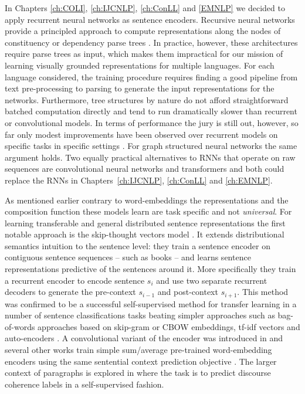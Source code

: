In Chapters \ref{ch:COLI}, \ref{ch:IJCNLP}, \ref{ch:ConLL} and \ref{EMNLP} we decided to apply
recurrent neural networks as sentence encoders.
Recursive neural networks provide a principled approach to
compute representations along the nodes of constituency
or dependency parse trees \citep{socher2013recursive,socher2014grounded,le2015compositional,tai2015improved}.
In practice, however, these architectures require parse trees as input,
which makes them impractical for our mission of learning visually grounded
representations for multiple languages.
For each language considered, the training procedure requires finding a good
pipeline from text pre-processing to parsing to generate the input representations
for the networks. Furthermore, tree structures by nature do not
afford straightforward batched computation directly and tend to run dramatically
slower than recurrent or convolutional models. In terms of performance the jury
is still out, however, so far only modest improvements have been observed
over recurrent models on specific tasks in specific settings
\citep{li2015tree,tai2015improved}. For graph structured neural networks the
same argument holds. Two equally practical alternatives to RNNs
that operate on raw sequences are convolutional neural networks
\citep{bai2018empirical} and transformers \citep{vaswani2017attention} and both could
replace the RNNs in Chapters~\ref{ch:IJCNLP}, \ref{ch:ConLL} and \ref{ch:EMNLP}.



As mentioned earlier contrary to word-embeddings the representations
and the composition function these models learn are task specific and not \emph{universal}.
For learning transferable and general distributed sentence representations the
first notable approach is the
skip-thought vectors model \citep{kiros2015skip}.
It extends distributional semantics intuition to the sentence level:
they train a sentence encoder on contiguous sentence sequences
-- such as books -- and learns sentence representations predictive of the sentences around it.
More specifically
they train a recurrent encoder to encode sentence $s_i$ and use two separate recurrent decoders to
generate the pre-context $s_{i-1}$ and post-context $s_{i+1}$.
This method was confirmed to be a successful self-supervised method for transfer
learning in a number of sentence
classifications tasks beating simpler approaches such as bag-of-words approaches based on skip-gram
or CBOW embeddings, tf-idf vectors and auto-encoders \citep{hill2016learning}. A convolutional
variant of the encoder was introduced in \cite{gan2016unsupervised} and several other works
train simple sum/average pre-trained word-embedding encoders using the same sentential 
context prediction objective \citep{kenter2016siamese,hill2016learning}. The larger context of paragraphs is
explored in \cite{jernite2017discourse} where the task is to predict discourse coherence
labels in a self-supervised fashion.

